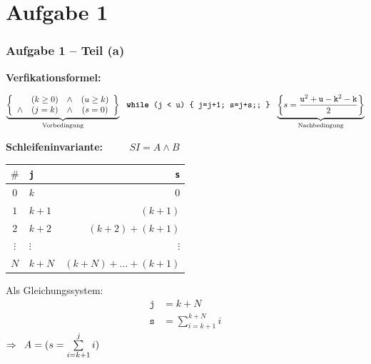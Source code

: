 \documentclass{beamer}
\renewcommand{\emph}[1]{\textbf{#1}}
\begin{document}
\section{Aufgabe 1}

\begin{frame}[t] \frametitle{Aufgabe 1 -- Teil (a)}
	\footnotesize
	\textbf{Verfikationsformel:}
	\begin{scriptsize}
		\setlength\arraycolsep{1pt}
		\begin{equation*}
			\underbrace{ \left\{ \begin{array}{cccc}
					      & (k \ge 0) &\land& (u \ge k) \\
					\land & (j = k)   &\land& (s = 0)
				\end{array}
			\right\}}_{\text{Vorbedingung}} \ \ \texttt{\emph{while} (\texttt{j} < \texttt{u}) \{ \texttt{j=j+1; s=j+s;}; \}} \ \ \underbrace{ \left\{
				s = \frac{\texttt{u}^2 + \texttt{u} - \texttt{k}^2 - \texttt{k}}{2}
			\right\}}_{\text{Nachbedingung}}
		\end{equation*}
	\end{scriptsize}
	
	
	\pause
	
	\textbf{Schleifeninvariante:} $\qquad$ $SI = A \land B$ \pause
	
	\begin{minipage}{\dimexpr0.6\linewidth-\fboxrule-\fboxsep}
		\begin{center}
			\begin{tabular}{|c||l|r|}
				\hline
				$\#$ & \texttt{j} & \texttt{s} \\
				\hline\hline
				$0$	 & $k$   & $0$  \\
				$1$  & $k+1$ & $(k+1)$  \\
				$2$  & $k+2$ & $(k+2) + (k+1)$ \\
				$\vdots$ & $\vdots$ & $\vdots$ \\
				$N$  & $k+N$ & $(k+N) + \dots + (k+1)$ \\
				\hline
			\end{tabular}
		\end{center}
	\end{minipage}
	\begin{minipage}{\dimexpr0.4\linewidth-\fboxrule-\fboxsep}
		\centering
		Als Gleichungssystem:
		\begin{equation*}
			\begin{array}{rl}
			\texttt{j} &= k + N \\ \texttt{s} &= \sum\limits_{i = k+1}^{k+N} i
			\end{array}
		\end{equation*}
		$\Rightarrow \enskip A = (s = \sum\limits_{i = k+1}^j i)$		
	\end{minipage}
\end{frame}
\end{document}

